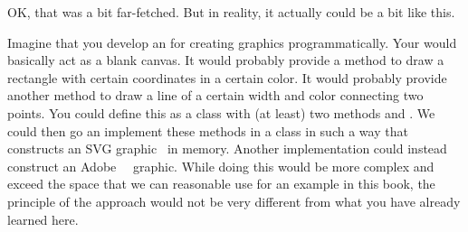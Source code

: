 OK, that was a bit far-fetched.
But in reality, it actually could be a bit like this.

Imagine that you develop an  for creating graphics programmatically.
Your  would basically act as a blank canvas.
It would probably provide a method to draw a rectangle with certain coordinates in a certain color.
It would probably provide another method to draw a line of a certain width and color connecting two points.
You could define this as a class with (at least) two methods  and .
We could then go an implement these methods in a class in such a way that constructs an SVG graphic~\cite{DDGLMSWFJJ2011SVGSSE} in memory.
Another implementation could instead construct an Adobe~~\cite{A2024WDPM,A2008P3DMPDFP1P1} graphic.
While doing this would be more complex and exceed the space that we can reasonable use for an example in this book, the principle of the approach would not be very different from what you have already learned here.%
\endhsection%
%
\FloatBarrier%
\endhsection%
